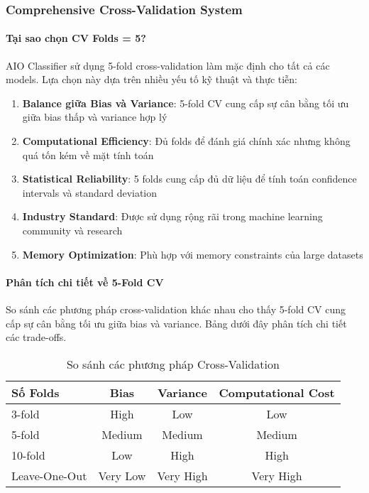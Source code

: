 \subsubsection{Comprehensive Cross-Validation System}

\paragraph{Tại sao chọn CV Folds = 5?}

AIO Classifier sử dụng 5-fold cross-validation làm mặc định cho tất cả các models. Lựa chọn này dựa trên nhiều yếu tố kỹ thuật và thực tiễn:

\begin{enumerate}
    \item \textbf{Balance giữa Bias và Variance}: 5-fold CV cung cấp sự cân bằng tối ưu giữa bias thấp và variance hợp lý
    \item \textbf{Computational Efficiency}: Đủ folds để đánh giá chính xác nhưng không quá tốn kém về mặt tính toán
    \item \textbf{Statistical Reliability}: 5 folds cung cấp đủ dữ liệu để tính toán confidence intervals và standard deviation
    \item \textbf{Industry Standard}: Được sử dụng rộng rãi trong machine learning community và research
    \item \textbf{Memory Optimization}: Phù hợp với memory constraints của large datasets
\end{enumerate}

\paragraph{Phân tích chi tiết về 5-Fold CV}

So sánh các phương pháp cross-validation khác nhau cho thấy 5-fold CV cung cấp sự cân bằng tối ưu giữa bias và variance. Bảng dưới đây phân tích chi tiết các trade-offs.

\begin{table}[H]
\centering
\begin{tabular}{|l|c|c|c|}
\hline
\textbf{Số Folds} & \textbf{Bias} & \textbf{Variance} & \textbf{Computational Cost} \\
\hline
3-fold & High & Low & Low \\
\hline
5-fold & Medium & Medium & Medium \\
\hline
10-fold & Low & High & High \\
\hline
Leave-One-Out & Very Low & Very High & Very High \\
\hline
\end{tabular}
\caption{So sánh các phương pháp Cross-Validation}
\end{table}

